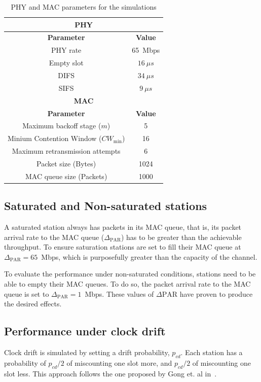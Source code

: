 \documentclass[a4paper,journal]{IEEEtran}
\begin{document}
	\begin{table}
		\centering
		\caption{PHY and MAC parameters for the simulations}
		\label{tab:mac-params}
		\begin{tabular}{|c|c|}
			\hline
			\multicolumn{2}{|c|}{{\bfseries PHY}}\\
			\hline
			{\bfseries Parameter} & {\bfseries Value}\\
			\hline
			PHY rate & 65~Mbps\\
			Empty slot & $16~\mu s$\\
			DIFS & $34~\mu s$\\
			SIFS & $9~\mu s$\\
			\hline
			\multicolumn{2}{|c|}{{\bfseries MAC}}\\
			\hline
			{\bfseries Parameter} & {\bfseries Value}\\
			\hline
			Maximum backoff stage ($m$) & 5\\
			Minium Contention Window ($CW_{\min}$) & 16\\
			Maximum retransmission attempts & 6\\
			Packet size (Bytes) & 1024\\
			MAC queue size (Packets) & 1000\\
			\hline
		\end{tabular}
	\end{table}
	
	\subsection{Saturated and Non-saturated stations}\label{unsaturation}
	A saturated station always has packets in its MAC queue, that is, its packet arrival rate to the MAC queue ($\Delta_{\text{PAR}}$) has to be greater than the achievable throughput. To ensure saturation stations are set to fill their MAC queue at $\Delta_{\text{PAR}}=65$~Mbps, which is purposefully greater than the capacity of the channel.
	
	To evaluate the performance under non-saturated conditions, stations need to be able to empty their MAC queues. To do so, the packet arrival rate to the MAC queue is set to $\Delta_{\text{PAR}}=1$~Mbps. These values of $\Delta{\text{PAR}}$ have proven to produce the desired effects.
	
	\subsection{Performance under clock drift}
	Clock drift is simulated by setting a drift probability, $p_{cd}$. Each station has a probability of $p_{cd}/2$ of miscounting one slot more, and $p_{cd}/2$ of miscounting one slot less. This approach follows the one proposed by Gong et. al in~\cite{slotDrift}.
	
\end{document}
